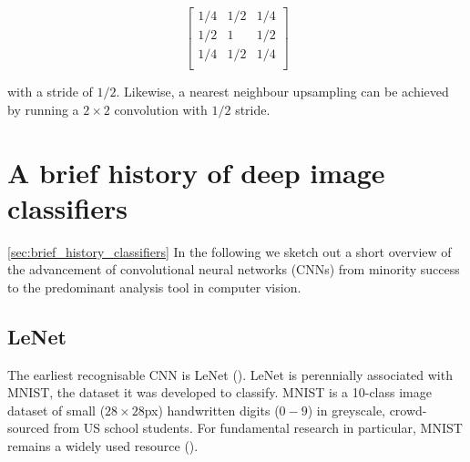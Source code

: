 $$
\begin{bmatrix}
1/4 & 1/2 & 1/4 \\
1/2 & 1 & 1/2 \\
1/4 & 1/2 & 1/4 \\
\end{bmatrix}
$$

with a stride of $1/2$. Likewise, a nearest neighbour upsampling can be achieved by running a $2 \times 2$ convolution with $1/2$ stride.


\section{A brief history of deep image classifiers}
\ref{sec:brief_history_classifiers}
In the following we sketch out a short overview of the advancement of convolutional neural networks (CNNs) from minority success to the predominant analysis tool in computer vision.

\subsection{LeNet}

The earliest recognisable CNN is LeNet (\cite{lecun1998gradient}). LeNet is perennially associated with MNIST, the dataset it was developed to classify. MNIST is a 10-class image dataset of small ($28\times28$px) handwritten digits ($0-9$) in greyscale, crowd-sourced from US school students. For fundamental research in particular, MNIST remains a widely used resource (\cite{sabour2017dynamic}).



